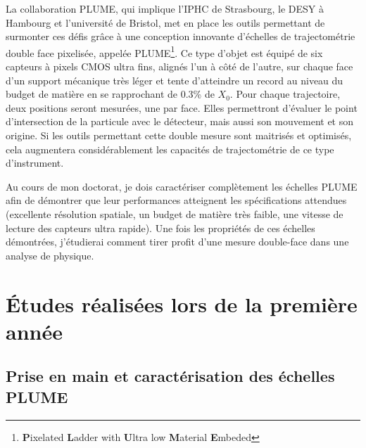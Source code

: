 \documentclass[a4papper, 10pt]{article}
\begin{document}
        La collaboration PLUME, qui implique l'IPHC de Strasbourg, le DESY à Hambourg et l'université de Bristol, met en place les outils permettant de surmonter ces défis grâce à une conception innovante d'échelles de trajectométrie double face pixelisée, appelée PLUME\footnote{\textbf{P}ixelated \textbf{L}adder with \textbf{U}ltra low \textbf{M}aterial \textbf{E}mbeded}. Ce type d'objet est équipé de six capteurs à pixels CMOS ultra fins, alignés l'un à côté de l'autre, sur chaque face d'un support mécanique très léger et tente d'atteindre un record au niveau du budget de matière en se rapprochant de 0.3\% de $X_0$.
       Pour chaque trajectoire, deux positions seront mesurées, une par face. Elles permettront d'évaluer le point d'intersection de la particule avec le détecteur, mais aussi son mouvement et son origine. Si les outils permettant cette double mesure sont maitrisés et optimisés, cela augmentera considérablement les capacités de trajectométrie de ce type d'instrument.

       Au cours de mon doctorat, je dois caractériser complètement les échelles PLUME afin de démontrer que leur performances atteignent les spécifications attendues (excellente résolution spatiale, un budget de matière très faible, une vitesse de lecture des capteurs ultra rapide). Une fois les propriétés de ces échelles démontrées, j'étudierai comment tirer profit d'une mesure double-face dans une analyse de physique.


    \section{Études réalisées lors de la première année}
        \subsection{Prise en main et caractérisation des échelles PLUME}
\end{document}
